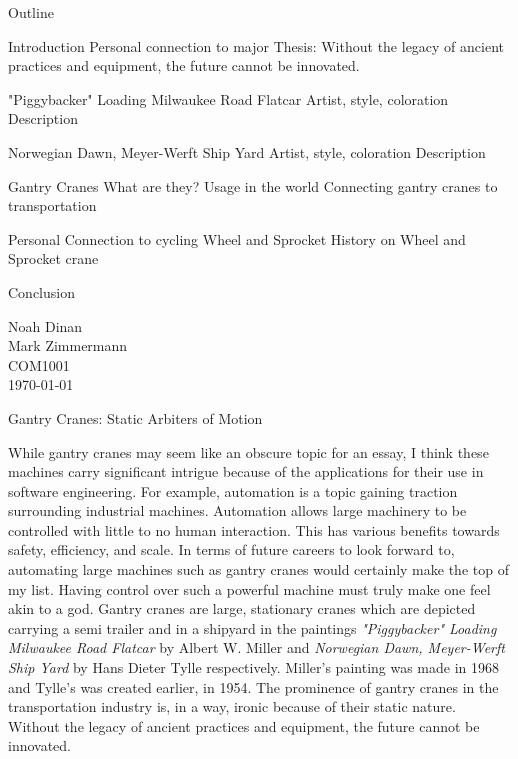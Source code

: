 \documentclass[12pt]{article}
\begin{document}
\begin{center}
Outline
\end{center}

\begin{outline}[enumerate]
\1 Introduction
    \2 Personal connection to major
    \2 Thesis: Without the legacy of ancient practices and equipment, the future cannot be innovated.

\1 "Piggybacker" Loading Milwaukee Road Flatcar
    \2 Artist, style, coloration
    \2 Description

\1 Norwegian Dawn, Meyer-Werft Ship Yard
    \2 Artist, style, coloration
    \2 Description

\1 Gantry Cranes
    \2 What are they?
    \2 Usage in the world
    \2 Connecting gantry cranes to transportation

\1 Personal Connection to cycling
    \2 Wheel and Sprocket
    \2 History on Wheel and Sprocket crane

\1 Conclusion

\end{outline}

\newpage

\noindent
Noah Dinan \\ Mark Zimmermann \\ COM1001 \\ \today \\

\begin{center}
Gantry Cranes: Static Arbiters of Motion
\end{center}

\setlength{\parindent}{0.5in}

While gantry cranes may seem like an obscure topic for an essay, I think these machines carry significant intrigue because of the applications for
their use in software engineering. For example, automation is a topic gaining traction surrounding industrial machines.
Automation allows large machinery to be controlled with little to no 
human interaction. This has various benefits towards safety, efficiency, and scale. In terms of future careers to look forward to, automating large machines such
as gantry cranes would certainly make the top of my list. Having control over such a powerful machine must truly make one feel akin to a god.
Gantry cranes are large, stationary cranes which are depicted carrying a semi trailer and in a shipyard
in the paintings \textit{"Piggybacker" Loading Milwaukee Road Flatcar} by Albert W. Miller and \textit{Norwegian Dawn, Meyer-Werft Ship Yard} by 
Hans Dieter Tylle respectively. Miller's painting was made in 1968 and Tylle's was created earlier, in 1954.
The prominence of gantry cranes in the transportation industry is, in a way, ironic because of their static nature.
Without the legacy of ancient practices and equipment, the future cannot be innovated.
\end{document}
